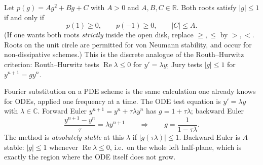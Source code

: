 \documentclass[11pt,a4paper]{article}
\begin{document}
\begin{proposition}
\label{prop:jury}
Let \(p(g)=Ag^2+Bg+C\) with \(A>0\) and \(A,B,C\in\mathbb R\). Both roots satisfy \(\lvert g\rvert\le 1\) if and only if
\[
p(1)\ge 0,
\qquad
p(-1)\ge 0,
\qquad
\lvert C\rvert\le A.
\]
(If one wants both roots \emph{strictly} inside the open disk, replace \(\ge,\le\) by \(>,<\). Roots on the unit circle are permitted for von Neumann stability, and occur for non-dissipative schemes.) This is the discrete analogue of the Routh--Hurwitz criterion: Routh--Hurwitz tests \(\operatorname{Re}\lambda\le 0\) for \(y'=\lambda y\); Jury tests \(\lvert g\rvert\le 1\) for \(y^{n+1}=g y^n\).
\end{proposition}

\begin{example}
\label{ex:ode-test}
Fourier substitution on a PDE scheme is the same calculation one already knows for ODEs, applied one frequency at a time. The ODE test equation is \(y'=\lambda y\) with \(\lambda\in\mathbb C\). Forward Euler \(y^{n+1}=y^n+\tau\lambda y^n\) has \(g=1+\tau\lambda\); backward Euler
\[
\frac{y^{n+1}-y^n}{\tau}
=
\lambda y^{n+1}
\qquad\Longrightarrow\qquad
g=\frac{1}{1-\tau\lambda}.
\]
The method is \emph{absolutely stable} at this \(\lambda\) if \(\lvert g(\tau\lambda)\rvert\le 1\). Backward Euler is \(A\)-stable: \(\lvert g\rvert\le 1\) whenever \(\operatorname{Re}\lambda\le 0\), i.e.\ on the whole left half-plane, which is exactly the region where the ODE itself does not grow.


\end{example}
\end{document}
